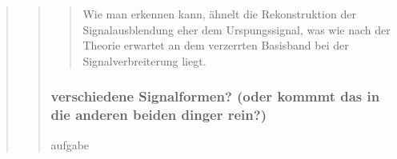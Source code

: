 \begin{quote}
\begin{quote}
\begin{quote}
             
             Wie man erkennen kann, ähnelt die Rekonstruktion der
             Signalausblendung eher dem Urspungssignal, was wie nach der Theorie
             erwartet an dem verzerrten Basisband bei der Signalverbreiterung
             liegt.
        \end{quote}


        \subsubsection{verschiedene Signalformen? (oder kommmt das in die anderen beiden dinger rein?)}
        aufgabe
        \begin{quote}
            
        \end{quote}


        
        
        
    \end{quote}
    
\end{quote}









%     
%         

% 
% 
% 



